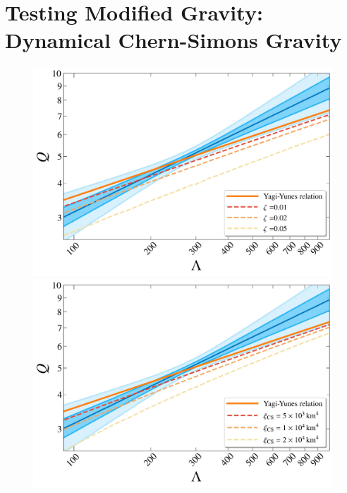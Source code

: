 \documentclass[a4paper,11pt]{article}
\begin{document}
\section{Testing Modified Gravity: Dynamical Chern-Simons Gravity}
\label{sec5}

\begin{figure}[htbp]
    \centering
    \begin{minipage}{0.48\linewidth}
        \includegraphics[width=\linewidth]{CS_zeta_AP4_2d.pdf}
    \end{minipage}
    \hfill
    \begin{minipage}{0.48\linewidth}
        \includegraphics[width=\linewidth]{CS_xi_cs_AP4_2d.pdf}
    \end{minipage}
    \vspace{3mm}

\end{figure}
\end{document}
